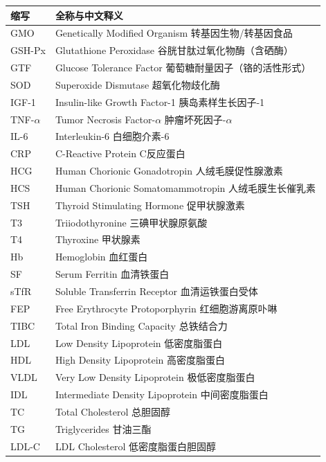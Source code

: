 \begin{table}[H]
\centering
\begin{tabularx}{\textwidth}{lX}
\toprule
\textbf{缩写} & \textbf{全称与中文释义} \\
\midrule
GMO & Genetically Modified Organism \hfill 转基因生物/转基因食品 \\
GSH-Px & Glutathione Peroxidase \hfill 谷胱甘肽过氧化物酶（含硒酶） \\
GTF & Glucose Tolerance Factor \hfill 葡萄糖耐量因子（铬的活性形式） \\
SOD & Superoxide Dismutase \hfill 超氧化物歧化酶 \\
IGF-1 & Insulin-like Growth Factor-1 \hfill 胰岛素样生长因子-1 \\
TNF-$\alpha$ & Tumor Necrosis Factor-$\alpha$ \hfill 肿瘤坏死因子-$\alpha$ \\
IL-6 & Interleukin-6 \hfill 白细胞介素-6 \\
CRP & C-Reactive Protein \hfill C反应蛋白 \\
HCG & Human Chorionic Gonadotropin \hfill 人绒毛膜促性腺激素 \\
HCS & Human Chorionic Somatomammotropin \hfill 人绒毛膜生长催乳素 \\
TSH & Thyroid Stimulating Hormone \hfill 促甲状腺激素 \\
T3 & Triiodothyronine \hfill 三碘甲状腺原氨酸 \\
T4 & Thyroxine \hfill 甲状腺素 \\
Hb & Hemoglobin \hfill 血红蛋白 \\
SF & Serum Ferritin \hfill 血清铁蛋白 \\
sTfR & Soluble Transferrin Receptor \hfill 血清运铁蛋白受体 \\
FEP & Free Erythrocyte Protoporphyrin \hfill 红细胞游离原卟啉 \\
TIBC & Total Iron Binding Capacity \hfill 总铁结合力 \\
LDL & Low Density Lipoprotein \hfill 低密度脂蛋白 \\
HDL & High Density Lipoprotein \hfill 高密度脂蛋白 \\
VLDL & Very Low Density Lipoprotein \hfill 极低密度脂蛋白 \\
IDL & Intermediate Density Lipoprotein \hfill 中间密度脂蛋白 \\
TC & Total Cholesterol \hfill 总胆固醇 \\
TG & Triglycerides \hfill 甘油三酯 \\
LDL-C & LDL Cholesterol \hfill 低密度脂蛋白胆固醇 \\

\end{tabularx}
\end{table}
